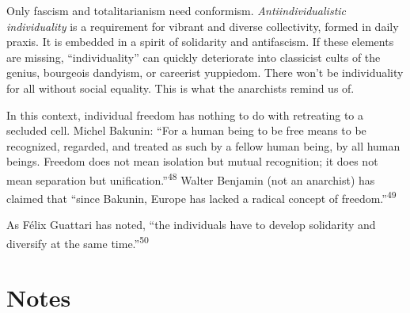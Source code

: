 Only fascism and totalitarianism need conformism. \textit{Antiindividualistic
individuality} is a requirement for vibrant and diverse collectivity, formed in
daily praxis. It is embedded in a spirit of solidarity and antifascism. If these
elements are missing, “individuality” can quickly deteriorate into classicist
cults of the genius, bourgeois dandyism, or careerist yuppiedom. There won’t be
individuality for all without social equality. This is what the anarchists
remind us of.

In this context, individual freedom has nothing to do with retreating to a
secluded cell. Michel Bakunin: “For a human being to be free means to be
recognized, regarded, and treated as such by a fellow human being, by all human
beings. Freedom does not mean isolation but mutual recognition; it does not mean
separation but unification.”\textsuperscript{48} Walter Benjamin (not an
anarchist) has claimed that “since Bakunin, Europe has lacked a radical concept
of freedom.”\textsuperscript{49}

As Félix Guattari has noted, “the individuals have to develop solidarity and
diversify at the same time.”\textsuperscript{50}

\newpage

\vspace*{2.5cm}
\section*{Notes}
\vspace*{4cm}


